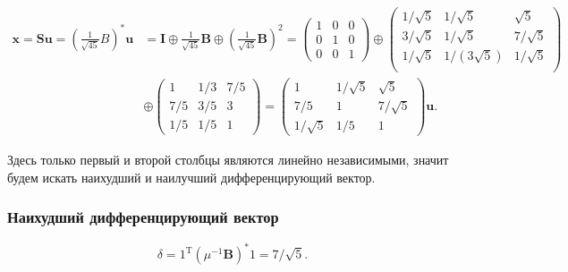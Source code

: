\documentclass[specialist,
	substylefile = spbu_report.rtx,
	subf,href,colorlinks=true, 12pt]{disser}
\begin{document}
\begin{align*}
	\boldsymbol{x} = \boldsymbol{S}\boldsymbol{u} = \left(\frac{1}{\sqrt{45}}B\right)^*\boldsymbol{u} & =
	\boldsymbol{I} \oplus \frac{1}{\sqrt{45}} \boldsymbol{B} \oplus (\frac{1}{\sqrt{45}} \boldsymbol{B})^2 =
	\begin{pmatrix}1& 0& 0\\0& 1& 0\\0& 0& 1\end{pmatrix}
	\oplus
	\begin{pmatrix}
		1/\sqrt{5} & 1/\sqrt{5}     & \sqrt{5}   \\
		3/\sqrt{5} & 1/\sqrt{5}     & 7/\sqrt{5} \\
		1/\sqrt{5} & 1/(3 \sqrt{5}) & 1/\sqrt{5} \\
	\end{pmatrix}                                          \\
	                                                           & \oplus
	\begin{pmatrix}1& 1/3& 7/5\\7/5& 3/5& 3\\1/5& 1/5& 1\end{pmatrix} =
	\begin{pmatrix} 1&1/\sqrt{5}&\sqrt{5}\\ 7/5&1&7/\sqrt{5}\\ 1/\sqrt{5}&1/5&1 \end{pmatrix}\boldsymbol{u}.
\end{align*}

Здесь только первый и второй столбцы являются линейно независимыми, значит будем искать наихудший и наилучший дифференцирующий вектор.

\subsubsection{Наихудший дифференцирующий вектор}
\[
	\delta = 1^\mathrm{T}(\mu^{-1}\boldsymbol{B})^*1 = 7/\sqrt{5}.
\]
\end{document}
